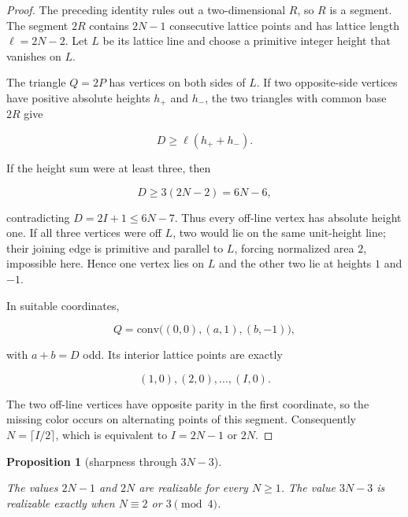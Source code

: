 \documentclass[11pt]{article}
\newtheorem{proposition}[theorem]{Proposition}
\theoremstyle{remark}
\numberwithin{equation}{section}
\begin{document}
\begin{proof}

The preceding identity rules out a two-dimensional $R$, so $R$ is a segment. The segment $2R$ contains $2N-1$ consecutive lattice points and has lattice length $\ell=2N-2$. Let $L$ be its lattice line and choose a primitive integer height that vanishes on $L$.

The triangle $Q=2P$ has vertices on both sides of $L$. If two opposite-side vertices have positive absolute heights $h_+$ and $h_-$, the two triangles with common base $2R$ give

\[
D\geq\ell(h_++h_-).
\]

If the height sum were at least three, then

\[
D\geq3(2N-2)=6N-6,
\]

contradicting $D=2I+1\le6N-7$. Thus every off-line vertex has absolute height one. If all three vertices were off $L$, two would lie on the same unit-height line; their joining edge is primitive and parallel to $L$, forcing normalized area $2$, impossible here. Hence one vertex lies on $L$ and the other two lie at heights $1$ and $-1$.

In suitable coordinates,

\[
Q=\mathrm{conv}\bigl((0,0),(a,1),(b,-1)\bigr),
\]

with $a+b=D$ odd. Its interior lattice points are exactly

\[
(1,0),(2,0),\ldots,(I,0).
\]

The two off-line vertices have opposite parity in the first coordinate, so the missing color occurs on alternating points of this segment. Consequently $N=\lceil I/2\rceil$, which is equivalent to $I=2N-1$ or $2N$.
\end{proof}


\begin{proposition}[sharpness through $3N-3$]\label{prop:near-sharp}

The values $2N-1$ and $2N$ are realizable for every $N\ge1$. The value $3N-3$ is realizable exactly when $N\equiv2$ or $3\pmod4$.

\end{proposition}
\end{document}
